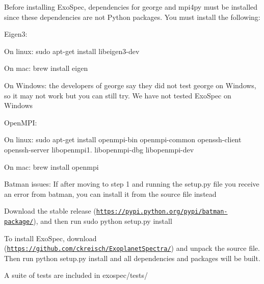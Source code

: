 \begin{DoxyItemize}
\item Before installing Exo\+Spec, dependencies for george and mpi4py must be installed since these dependencies are not Python packages. You must install the following\+:
\begin{DoxyItemize}
\item Eigen3\+:
\begin{DoxyItemize}
\item On linux\+: sudo apt-\/get install libeigen3-\/dev
\item On mac\+: brew install eigen
\item On Windows\+: the developers of george say they did not test george on Windows, so it may not work but you can still try. We have not tested Exo\+Spec on Windows
\end{DoxyItemize}
\item Open\+M\+PI\+:
\begin{DoxyItemize}
\item On linux\+: sudo apt-\/get install openmpi-\/bin openmpi-\/common openssh-\/client openssh-\/server libopenmpi1. libopenmpi-\/dbg libopenmpi-\/dev
\item On mac\+: brew install openmpi
\end{DoxyItemize}
\item Batman issues\+: If after moving to step 1 and running the setup.\+py file you receive an error from batman, you can install it from the source file instead
\begin{DoxyItemize}
\item Download the stable release (\href{https://pypi.python.org/pypi/batman-package/}{\tt https\+://pypi.\+python.\+org/pypi/batman-\/package/}), and then run sudo python setup.\+py install
\end{DoxyItemize}
\end{DoxyItemize}
\item To install Exo\+Spec, download (\href{https://github.com/ckreisch/ExoplanetSpectra/}{\tt https\+://github.\+com/ckreisch/\+Exoplanet\+Spectra/}) and unpack the source file. Then run python setup.\+py install and all dependencies and packages will be built.
\item A suite of tests are included in exospec/tests/ 
\end{DoxyItemize}